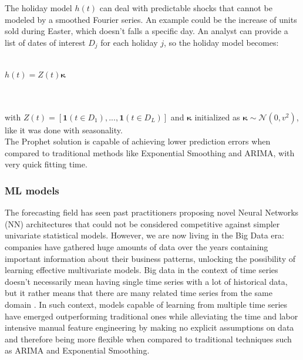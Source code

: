 \documentclass[a4paper, 12pt]{article} %
\begin{document}
	The holiday model $h(t)$ can deal with predictable shocks that cannot be modeled by a smoothed Fourier series.  An example could be the increase of units sold during Easter, which doesn't falls a specific day. An analyst can provide a list of dates of interest $D_j$ for each holiday $j$, so the holiday model becomes:\\\\
	\centerline{$h(t) = Z(t) \pmb{\kappa}$}\\\\
	with $Z(t) = [ \mathbf{1} (t \in D_1), ..., \mathbf{1} (t \in D_L)] $ and $\pmb{\kappa}$ initialized as $\pmb{\kappa} \sim \mathcal{N}(0, v^2)$, like it was done with seasonality.\\
	The Prophet solution is capable of achieving lower prediction errors when compared to traditional methods like Exponential Smoothing and ARIMA, with very quick fitting time.
	
	\subsubsection{ML models}
	The forecasting field has seen past practitioners proposing novel Neural Networks (NN) architectures that could not be considered competitive against simpler univariate statistical models. However, we are now living in the Big Data era: companies have gathered huge amounts of data over the years containing important information about their business patterns, unlocking the possibility of learning effective multivariate models. Big data in the context of time series doesn't necessarily mean having single time series with a lot of historical data, but it rather means that there are many related time series from the same domain \cite{RNNForecasting}. In such context, models capable of learning from multiple time series have emerged \cite{M5Competition} outperforming traditional ones while alleviating the time and labor intensive manual feature engineering by making no explicit assumptions on data and therefore being more flexible when compared to traditional techniques such as ARIMA and Exponential Smoothing.
	
\end{document}

